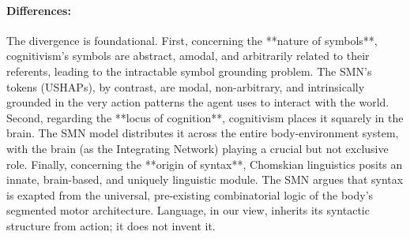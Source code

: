 \paragraph{Differences:} The divergence is foundational. First, concerning the **nature of symbols**, cognitivism's symbols are abstract, amodal, and arbitrarily related to their referents, leading to the intractable symbol grounding problem. The SMN's tokens (USHAPs), by contrast, are modal, non-arbitrary, and intrinsically grounded in the very action patterns the agent uses to interact with the world. Second, regarding the **locus of cognition**, cognitivism places it squarely in the brain. The SMN model distributes it across the entire body-environment system, with the brain (as the Integrating Network) playing a crucial but not exclusive role. Finally, concerning the **origin of syntax**, Chomskian linguistics posits an innate, brain-based, and uniquely linguistic module. The SMN argues that syntax is exapted from the universal, pre-existing combinatorial logic of the body's segmented motor architecture. Language, in our view, inherits its syntactic structure from action; it does not invent it.
